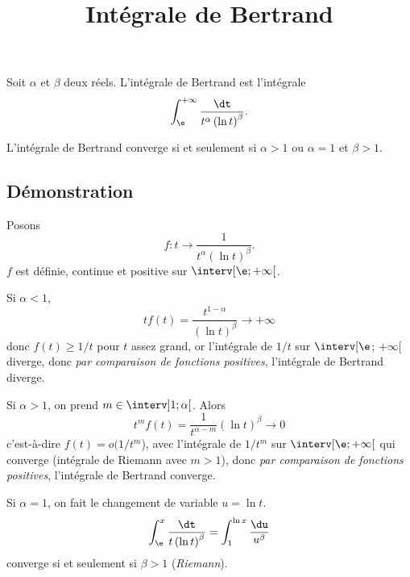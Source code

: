 \documentclass[fontsize=12pt,twoside=false,parskip=half, french]{scrartcl}
\title{Intégrale de Bertrand}
\date{}
\author{}
\begin{document}
\maketitle
    Soit $\alpha$ et $\beta$ deux réels. L’intégrale de Bertrand est l’intégrale
   \[
      \int_{\e}^{+\infty} \frac{\dt}{t^\alpha \left(\ln t \right)^\beta}.
   \]
   \begin{Theoreme}
      L’intégrale de Bertrand converge si et seulement si $\alpha > 1$ ou $\alpha = 1$ et $\beta > 1$.
   \end{Theoreme}
   \subsection{Démonstration}
      Posons
      \[
         f \colon t \to \frac{1}{t^\alpha \left(\ln t \right)^\beta}.
      \]
      $f$ est définie, continue et positive sur $\interv[\e ; +\infty[$.
      
      Si $\alpha < 1$,
      \[
         tf(t) = \frac{t^{1 -\alpha}}{\left(\ln t \right)^\beta} \to +\infty
      \]
      donc $f(t) \geq 1/t$ pour $t$ assez grand, or l’intégrale de $1/t$ sur $\interv[\e$; $+\infty[$ diverge, donc \emph{par comparaison de fonctions positives}, l’intégrale de Bertrand diverge.
      
      Si $\alpha > 1$, on prend $m \in \interv]1; \alpha[$. Alors
      \[
         t^mf(t) = \frac{1}{t^{\alpha - m}}{\left(\ln t \right)^\beta} \to 0
      \]
      c’est-à-dire $f(t) = o(1/t^m$), avec l’intégrale de $1/t^m$ sur $\interv[\e ; +\infty[$ qui converge (intégrale de Riemann avec $m > 1$), donc \emph{par comparaison de fonctions positives}, l’intégrale de Bertrand converge.
         
      Si $\alpha = 1$, on fait le changement de variable $u = \ln t$.
      \[
         \int_{\e}^x \frac{\dt}{t \left(\ln t \right)^\beta} = \int_1^{\ln x} \frac{\du}{u^\beta}
      \]
      converge si et seulement si $\beta > 1$ (\emph{Riemann}).
   
\end{document}
